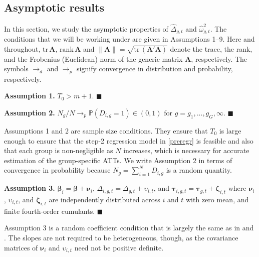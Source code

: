 \documentclass[12pt,fleqn]{article}
\def\*#1{\mathbf{#1}}
\def\+#1{\boldsymbol{#1}}
\begin{document}
\subsection{Asymptotic results}

In this section, we study the asymptotic properties of $\widehat \Delta_{g,t}$ and $\widehat \omega_{g,t}^2$. The conditions that we will be working under are given in Assumptions 1--9. Here and throughout, $\mathrm{tr}\, \*A$, $\mathrm{rank}\, \*A$ and $\|\*A\| = \sqrt{\mathrm{tr}\,(\*A'\*A)}$ denote the trace, the rank, and the Frobenius (Euclidean) norm of the generic matrix $\*A$, respectively. The symbols $\to_d$ and $\to_p$ signify convergence in distribution and probability, respectively.

\bigskip

\noindent \textbf{Assumption 1.} $T_0 > m+1$. $\blacksquare$

\bigskip

\noindent \textbf{Assumption 2.} $N_g/N \to_p \mathds{P}(D_{i,g} = 1) \in (0, 1)$ for $g = g_1,...,g_G,\infty$. $\blacksquare$

\bigskip

Assumptions 1 and 2 are sample size conditions. They ensure that $T_0$ is large enough to ensure that the step-2 regression model in \eqref{preregr} is feasible and also that each group is non-negligible as $N$ increases, which is necessary for accurate estimation of the group-specific ATTs. We write Assumption 2 in terms of convergence in probability because $N_g = \sum_{i = 1}^N D_{i,g}$ is a random quantity. 

\bigskip

\noindent \textbf{Assumption 3.} $\+\beta_{i} = \+\beta + \+\nu_i$, $\Delta_{i,g,t}= \Delta_{g,t} + \upsilon_{i,t}$, and $\+\tau_{i,g,t} = \+\tau_{g,t} + \+\zeta_{i,t}$ where $\+\nu_i$, $\upsilon_{i,t}$, and $\+\zeta_{i,t}$ are independently distributed across $i$ and $t$ with zero mean, and finite fourth-order cumulants. $\blacksquare$

\bigskip

Assumption 3 is a random coefficient condition that is largely the same as in \citet{chan2022pcdid} and \citet{Gobillon_Magnac_2016}. The slopes are not required to be heterogeneous, though, as the covariance matrices of $\+\nu_i$ and $\upsilon_{i,t}$ need not be positive definite.
\end{document}
